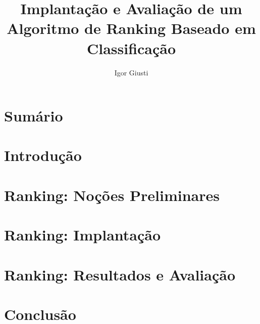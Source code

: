 \documentclass{beamer}
\title{Implantação e Avaliação de um Algoritmo de Ranking Baseado em Classificação}
\author{Igor Giusti}
\begin{document}
\frame{\titlepage}

\section{Sumário}
\frame{\tableofcontents}

\section{Introdução}


\section{Ranking: Noções Preliminares}


\section{Ranking: Implantação}


\section{Ranking: Resultados e Avaliação}


\section{Conclusão}


\begin{frame}
    
\end{frame}
\end{document}
